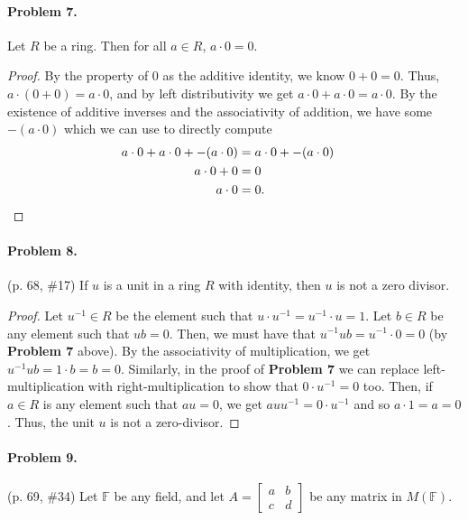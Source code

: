 \documentclass[12pt]{article}
\begin{document}
\begin{enumerate}
\end{enumerate}


\paragraph{Problem 7.} Let $R$ be a ring. Then for all $a \in R$, $a \cdot 0 = 0$.

\begin{proof}
    By the property of $0$ as the additive identity, we know $0 + 0 = 0$. Thus, $a \cdot (0 + 0) = a \cdot 0$, and by left distributivity we get $a \cdot 0 + a \cdot 0 = a \cdot 0$. By the existence of additive inverses and the associativity of addition, we have some $-(a \cdot 0)$ which we can use to directly compute
    \begin{align*}
        a \cdot 0 + a \cdot 0 + -(a \cdot 0) &= a \cdot 0 + -(a\cdot 0) \\
        a \cdot 0 + 0 &= 0 \\ a \cdot 0 &= 0. &\qedhere
    \end{align*}
\end{proof}

\paragraph{Problem 8.} (p. 68, \#17) If $u$ is a unit in a ring $R$ with identity, then $u$ is not a zero divisor.

\begin{proof}
    Let $u^{-1} \in R$ be the element such that $u \cdot u^{-1} = u^{-1} \cdot u = 1$. Let $b \in R$ be any element such that $ub = 0$. Then, we must have that $u^{-1} u b = u^{-1} \cdot 0 = 0$ (by \textbf{Problem 7} above). By the associativity of multiplication, we get $u^{-1} u b = 1 \cdot b = b = 0$. Similarly, in the proof of \textbf{Problem 7} we can replace left-multiplication with right-multiplication to show that $0 \cdot u^{-1} = 0$ too. Then, if $a \in R$ is any element such that $a u = 0$, we get $a u u^{-1} = 0 \cdot u^{-1}$ and so $a \cdot 1 = a = 0$. Thus, the unit $u$ is not a zero-divisor.
\end{proof}

\paragraph{Problem 9.} (p. 69, \#34) Let $\mathbb F$ be any field, and let $A = \begin{bmatrix} a & b \\ c & d \end{bmatrix}$ be any matrix in $M(\mathbb F)$.
\end{document}
